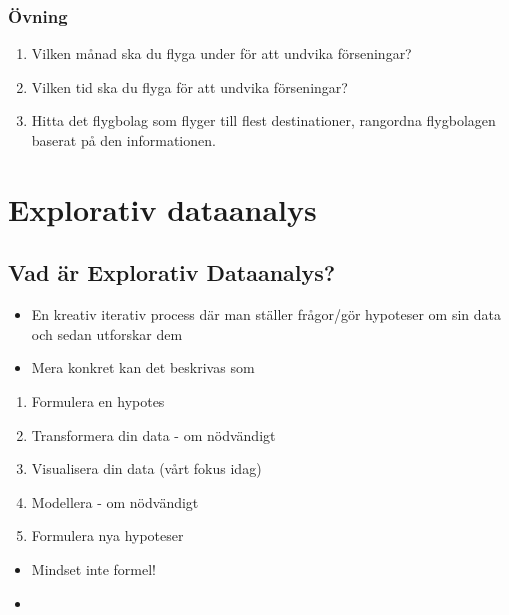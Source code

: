 \documentclass[
]{book}
\providecommand{\tightlist}{%
  \setlength{\itemsep}{0pt}\setlength{\parskip}{0pt}}
\begin{document}
\hypertarget{uxf6vning-3}{%
\subsection{Övning}\label{uxf6vning-3}}

\begin{enumerate}
\def\labelenumi{\arabic{enumi}.}
\tightlist
\item
  Vilken månad ska du flyga under för att undvika förseningar?
\item
  Vilken tid ska du flyga för att undvika förseningar?
\item
  Hitta det flygbolag som flyger till flest destinationer, rangordna flygbolagen baserat på den informationen.
\end{enumerate}

\hypertarget{eda}{%
\chapter{Explorativ dataanalys}\label{eda}}

\hypertarget{vad-uxe4r-explorativ-dataanalys}{%
\section{Vad är Explorativ Dataanalys?}\label{vad-uxe4r-explorativ-dataanalys}}

\begin{itemize}
\item
  En kreativ iterativ process där man ställer frågor/gör hypoteser om sin data och sedan utforskar dem
\item
  Mera konkret kan det beskrivas som
\end{itemize}

\begin{enumerate}
\def\labelenumi{\arabic{enumi}.}
\tightlist
\item
  Formulera en hypotes
\item
  Transformera din data - om nödvändigt
\item
  Visualisera din data (vårt fokus idag)
\item
  Modellera - om nödvändigt
\item
  Formulera nya hypoteser
\end{enumerate}

\begin{itemize}
\item
  Mindset inte formel!
\item
\end{itemize}
\end{document}
